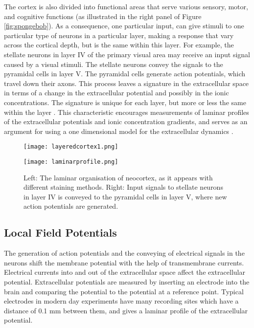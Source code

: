 \documentclass{article}
\begin{document}
The cortex is also divided into functional areas that serve various sensory, motor, and cognitive functions (as illustrated in the right panel of Figure \ref{fig:spongebob}). As a consequence, one particular input, can give stimuli to one particular type of neurons in a particular layer, making a response that vary across the cortical depth, but is the same within this layer. For example, the stellate neurons in layer IV of the primary visual area may receive an input signal caused by a visual stimuli. The stellate neurons convey the signals to the pyramidal cells in layer V. The pyramidal cells generate action potentials, which travel down their axons. This process leaves a signature in the extracellular space in terms of a change in the extracellular potential and possibly in the ionic concentrations. The signature is unique for each layer, but more or less the same within the layer \cite{Neuroscience}. This characteristic encourages measurements of laminar profiles of the extracellular potentials and ionic concentration gradients, and serves as an argument for using a one dimensional model for the extracellular dynamics \cite{Mayer2010}.



\begin{figure}[!tbp]
  \centering
  \begin{minipage}[b]{0.5\textwidth}
    \texttt{[image: layeredcortex1.png]}
  \end{minipage}
  \begin{minipage}[b]{0.45\textwidth}
    \texttt{[image: laminarprofile.png]}
  \end{minipage}  
   \caption{Left: The laminar organisation of neocortex, as it appears with different staining methods. Right: Input signals to stellate neurons in layer IV is conveyed to the pyramidal cells in layer V, where new action potentials are generated.}
  \label{fig:laminarcortex}
\end{figure}



\subsection{Local Field Potentials}\label{Local Field Potentials}
The generation of action potentials and the conveying of electrical signals in the neurons shift the membrane potential with the help of transmembrane currents. Electrical currents into and out of the extracellular space affect the extracellular potential. Extracellular potentials are measured by inserting an electrode into the brain and comparing the potential to the potential at a reference point. Typical  electrodes in modern day experiments have many recording sites which have a distance of 0.1 mm \cite{EinevollLFP} between them, and gives a laminar profile of the extracellular potential. 
\end{document}

